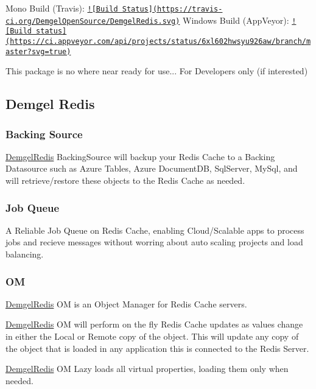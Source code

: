 Mono Build (Travis)\+: \href{https://travis-ci.org/DemgelOpenSource/DemgelRedis}{\tt !\mbox{[}Build Status\mbox{]}(https\+://travis-\/ci.\+org/\+Demgel\+Open\+Source/\+Demgel\+Redis.\+svg)} Windows Build (App\+Veyor)\+: \href{https://ci.appveyor.com/project/tenowg/demgelredis/branch/master}{\tt !\mbox{[}Build status\mbox{]}(https\+://ci.\+appveyor.\+com/api/projects/status/6xl602hwsyu926aw/branch/master?svg=true)}

This package is no where near ready for use... For Developers only (if interested)

\subsection*{Demgel Redis}

\subsubsection*{Backing Source}

\hyperlink{namespace_demgel_redis}{Demgel\+Redis} Backing\+Source will backup your Redis Cache to a Backing Datasource such as Azure Tables, Azure Document\+D\+B, Sql\+Server, My\+Sql, and will retrieve/restore these objects to the Redis Cache as needed.

\subsubsection*{Job Queue}

A Reliable Job Queue on Redis Cache, enabling Cloud/\+Scalable apps to process jobs and recieve messages without worring about auto scaling projects and load balancing.

\subsubsection*{O\+M}

\hyperlink{namespace_demgel_redis}{Demgel\+Redis} O\+M is an {\ttfamily Object Manager} for Redis Cache servers.

\hyperlink{namespace_demgel_redis}{Demgel\+Redis} O\+M will perform {\ttfamily on the fly} Redis Cache updates as values change in either the Local or Remote copy of the object. This will update any copy of the object that is loaded in any application this is connected to the Redis Server.

\hyperlink{namespace_demgel_redis}{Demgel\+Redis} O\+M Lazy loads all {\ttfamily virtual} properties, loading them only when needed.

